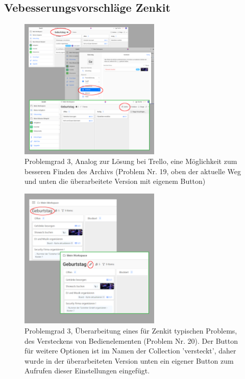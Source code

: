 \subsection{Vebesserungsvorschläge Zenkit}
\FloatBarrier
\begin{figure}[h] 
    \includegraphics[width=0.6\textwidth]{images/Verbesserungsvorschlaege/zenkitArchiv.png}
    \centering
    \caption{Problemgrad 3, Analog zur Lösung bei Trello, eine Möglichkeit zum besseren Finden des Archivs (Problem Nr. 19, oben der aktuelle Weg und unten die überarbeitete Version mit eigenem Button)}
    \label{fig:zenkitarchiv}
\end{figure}

\begin{figure}[h]   
    \includegraphics[width=0.6\textwidth]{images/Verbesserungsvorschlaege/ZenkitButton.png}
    \centering
    \caption{Problemgrad 3, Überarbeitung eines für Zenkit typischen Problems, des Versteckens von Bedienelementen (Problem Nr. 20). Der Button für weitere Optionen ist im Namen der Collection 'versteckt', daher wurde in der überarbeiteten Version unten ein eigener Button zum Aufrufen dieser Einstellungen eingefügt.}
    \label{fig:zenkitbutton}
\end{figure}

